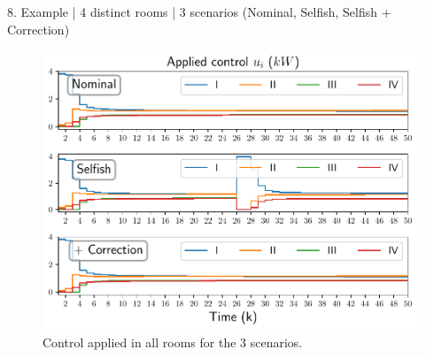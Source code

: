 \documentclass[presentation]{beamer}
\begin{document}
\begin{frame}
\begin{textblock}{15.6}
\begin{block}{8. Example | 4 distinct rooms | 3 scenarios (Nominal, Selfish, Selfish + Correction) }
\begin{minipage}[c]{26cm}
\begin{figure}[h]
          \includegraphics[width=\textwidth]{../img/airtemp_roomI/control_poster.pdf}
          \caption{\centering Control applied in all rooms for the 3 scenarios.}\label{fig:control_3Scenarios}
        \end{figure}
      \end{minipage}
      \hfill
    \end{block}
  \end{textblock}

\end{frame}
\end{document}
